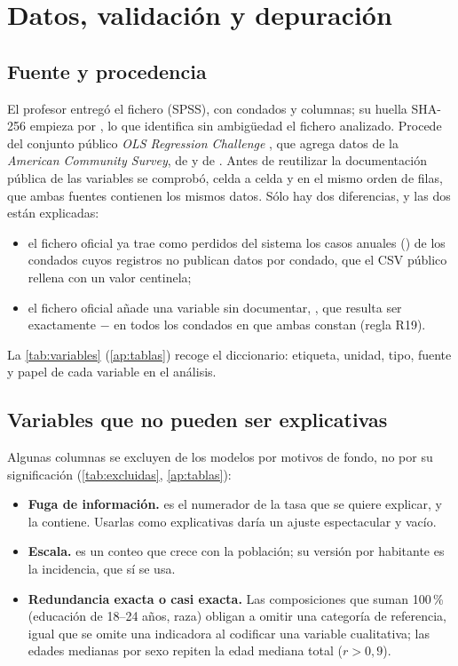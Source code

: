 \chapter{Datos, validación y depuración}\label{cap:datos}

\section{Fuente y procedencia}

El profesor entregó el fichero  (SPSS), con  condados y
 columnas; su huella SHA-256 empieza por , lo que identifica sin
ambigüedad el fichero analizado. Procede del conjunto público \emph{OLS Regression Challenge}
\parencite{rippner2017}, que agrega datos de la \emph{American Community Survey}, de
 y de . Antes de reutilizar la documentación pública de
las variables se comprobó, celda a celda y en el mismo orden de filas, que ambas fuentes
contienen los mismos datos. Sólo hay dos diferencias, y las dos están explicadas:
\begin{itemize}
  \item el fichero oficial ya trae como perdidos del sistema los casos anuales
  () de los condados cuyos registros no publican datos por condado, que el CSV
  público rellena con un valor centinela;
  \item el fichero oficial añade una variable sin documentar, , que resulta
  ser exactamente  $-$  en todos los condados en que
  ambas constan (regla R19).
\end{itemize}

La \cref{tab:variables} (\cref{ap:tablas}) recoge el diccionario: etiqueta, unidad, tipo, fuente
y papel de cada variable en el análisis.

\section{Variables que no pueden ser explicativas}

Algunas columnas se excluyen de los modelos por motivos de fondo, no por su significación
(\cref{tab:excluidas}, \cref{ap:tablas}):
\begin{itemize}
  \item \textbf{Fuga de información.}  es el numerador de la tasa que se
  quiere explicar, y  la contiene. Usarlas como explicativas daría un
  ajuste espectacular y vacío.
  \item \textbf{Escala.}  es un conteo que crece con la población; su
  versión por habitante es la incidencia, que sí se usa.
  \item \textbf{Redundancia exacta o casi exacta.} Las composiciones que suman \num{100}\,\%
  (educación de 18--24 años, raza) obligan a omitir una categoría de referencia, igual que se
  omite una indicadora al codificar una variable cualitativa; las edades medianas por sexo
  repiten la edad mediana total ($r > 0{,}9$).
\end{itemize}

